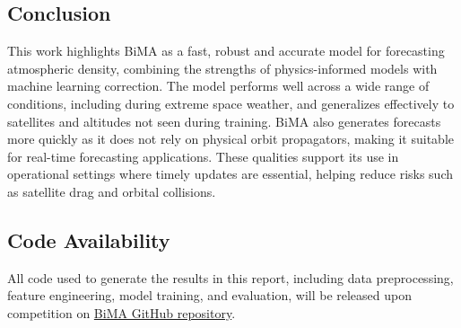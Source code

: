 \documentclass[11pt,a4paper]{storm-ai_report}
\begin{document}
\subsection{Conclusion}

This work highlights BiMA as a fast, robust and accurate model for forecasting atmospheric density, combining the strengths of physics-informed models with machine learning correction. The model performs well across a wide range of conditions, including during extreme space weather, and generalizes effectively to satellites and altitudes not seen during training. BiMA also generates forecasts more quickly as it does not rely on physical orbit propagators, making it suitable for real-time forecasting applications. These qualities support its use in operational settings where timely updates are essential, helping reduce risks such as satellite drag and orbital collisions.

\subsection{Code Availability}

All code used to generate the results in this report, including data preprocessing, feature engineering, model training, and evaluation, will be released upon competition on  \href{https://github.com/rasyidstat/BiMA}{BiMA GitHub repository}.


\printbibliography
\end{document}
